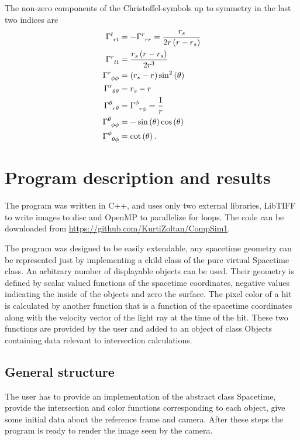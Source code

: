 \documentclass[pdftex,12pt,a4paper]{article}
\begin{document}
		The non-zero components of the Christoffel-symbols up to symmetry in the last two indices are
		\begin{equation}
			\begin{aligned}
				\tensor{\Gamma}{^t_r_t} &= -\tensor{\Gamma}{^r_r_r} = \frac{r_s}{2r\left(r-r_s\right)}\\
				\tensor{\Gamma}{^r_t_t} &= \frac{r_s\left(r-r_s\right)}{2r^3}\\
				\tensor{\Gamma}{^r_\phi_\phi} &= \left(r_s-r\right)\sin^2\left(\theta\right)\\
				\tensor{\Gamma}{^r_\theta_\theta} &= r_s - r\\
				\tensor{\Gamma}{^\theta_r_\theta} &= \tensor{\Gamma}{^\phi_r_\phi} = \frac{1}{r}\\
				\tensor{\Gamma}{^\theta_\phi_\phi} &= -\sin\left(\theta\right)\cos\left(\theta\right)\\
				\tensor{\Gamma}{^\phi_\theta_\phi} &= \cot\left(\theta\right).
			\end{aligned}
		\end{equation}
	\section{Program description and results}
		The program was written in C++, and uses only two external libraries, LibTIFF to write images to disc and OpenMP to parallelize for loops. The code can be downloaded from \url{https://github.com/KurtiZoltan/CompSim1}.
		
		The program was designed to be easily extendable, any spacetime geometry can be represented just by implementing a child class of the pure virtual Spacetime class. An arbitrary number of displayable objects can be used. Their geometry is defined by scalar valued functions of the spacetime coordinates, negative values indicating the inside of the objects and zero the surface. The pixel color of a hit is calculated by another function that is a function of the spacetime coordinates along with the velocity vector of the light ray at the time of the hit. These two functions are provided by the user and added to an object of class Objects containing data relevant to intersection calculations.
	\subsection{General structure}
		The user has to provide an implementation of the abstract class Spacetime, provide the intersection and color functions corresponding to each object, give some initial data about the reference frame and camera. After these steps the program is ready to render the image seen by the camera.
\end{document}

